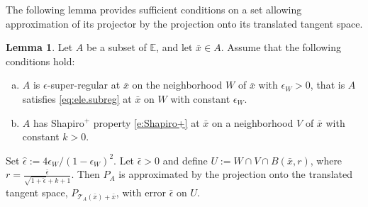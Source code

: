 \documentclass[12pt]{article}
\theoremstyle{definition}
\newtheorem{lemma}{Lemma}
\newcommand{\Ebb}{\mathbb{E}}
\begin{document}
The following lemma provides sufficient conditions on a set allowing approximation of its projector by the
projection onto its translated tangent space.
\begin{lemma}\label{lem:suff.cond.approxi}
Let $A$ be a subset of $\Ebb$, and let $\bar x\in A$.
Assume that the following conditions hold:
\begin{enumerate}[(a)]
    \item $A$ is $\epsilon$-super-regular  at $\bar x$ on the neighborhood $W$ of $\bar x$ with $\epsilon_W>0$,
    that is $A$ satisfies \eqref{eq:ele.subreg} at $\bar x$ on $W$ with constant $\epsilon_W$.
    \item $A$ has Shapiro$^+$ property \eqref{e:Shapiro+} at $\bar x$ on a neighborhood $V$ of $\bar x$ with constant $k>0$.
\end{enumerate}
\medskip

\noindent Set $\hat{\epsilon}:= 4\epsilon_W/(1-\epsilon_W)^2.$ %
 Let $\bar\epsilon>0$ and define $U:=W\cap V\cap B(\bar x,r)$, where $r=\frac{\bar\epsilon}{\sqrt{1+\hat{\epsilon}}+k+1}$.
Then $P_A$ is approximated by the projection onto the translated tangent space, $P_{\mathcal{T}_{A}(\bar x)+\bar x}$,
with error $\bar\epsilon$ on $U$.
\end{lemma}
\end{document}

